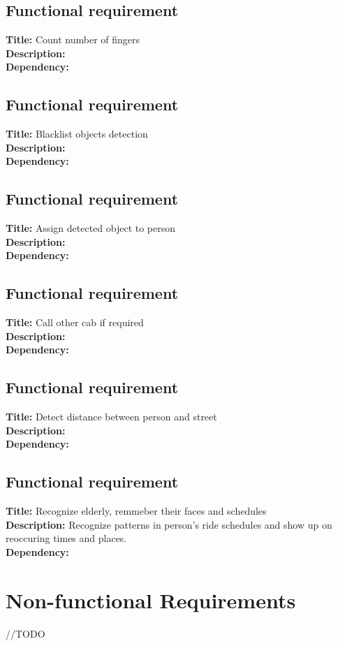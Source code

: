 \documentclass[12pt]{book}
\begin{document}
\subsection{Functional requirement} 
\textbf{Title:} Count number of fingers\\
\textbf{Description:} \\
\textbf{Dependency:}

\subsection{Functional requirement} 
\textbf{Title:} Blacklist objects detection \\
\textbf{Description:} \\
\textbf{Dependency:}

\subsection{Functional requirement} 
\textbf{Title:} Assign detected object to person \\
\textbf{Description:} \\
\textbf{Dependency:}

\subsection{Functional requirement} 
\textbf{Title:} Call other cab if required \\
\textbf{Description:} \\
\textbf{Dependency:}

\subsection{Functional requirement} 
\textbf{Title:} Detect distance between person and street \\
\textbf{Description:} \\
\textbf{Dependency:}

\subsection{Functional requirement} 
\textbf{Title:} Recognize elderly, remmeber their faces and schedules  \\
\textbf{Description:} Recognize patterns in person's ride schedules and show up on reoccuring times and places.\\
\textbf{Dependency:}

\section{Non-functional Requirements}
//TODO
\end{document}
